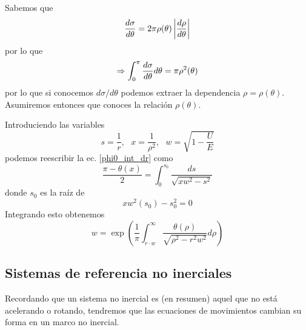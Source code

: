 \documentclass[]{article}
\numberwithin{equation}{section}
\begin{document}
Sabemos que
\begin{equation*}
	\dfrac{d \sigma}{d \theta} = 2\pi \rho(\theta) \left|\dfrac{d \rho}{d \theta}\right|
\end{equation*}
por lo que
\begin{equation}
	\Rightarrow \int_{0}^{\pi} \dfrac{d \sigma}{d \theta} d\theta = \pi \rho^2(\theta)
\end{equation}
por lo que si conocemos \(d\sigma/d\theta\) podemos extraer la dependencia \(\rho=\rho(\theta)\). Asumiremos entonces que conoces la relación \(\rho(\theta)\).

Introduciendo las variables 
\begin{equation*}
	s = \frac{1}{r}, ~~~x = \frac{1}{\rho^2}, ~~~w = \sqrt{1 - \frac{U}{E}}
\end{equation*}
podemos reescribir la ec. \ref{phi0_int_dr} como
\begin{equation*}
	\frac{\pi - \theta(x)}{2} = \int_{0}^{s_0} \frac{ds}{\sqrt{x w^2 - s^2}}
\end{equation*}
donde \(s_0\) es la raíz de
\begin{equation*}
	x w^2(s_0) - s_0^2 = 0
\end{equation*}
Integrando esto obtenemos
\begin{equation}
	w = \exp\left(\frac{1}{\pi} \int_{r\cdot w}^{\infty} \frac{\theta(\rho)}{\sqrt{\rho^2 - r^2 w^2}} d\rho\right)
\end{equation}

\subsection{Sistemas de referencia no inerciales}
Recordando que un sistema no inercial es (en resumen) aquel que no está acelerando o rotando, tendremos que las ecuaciones de movimientos cambian su forma en un marco no inercial.
\end{document}
